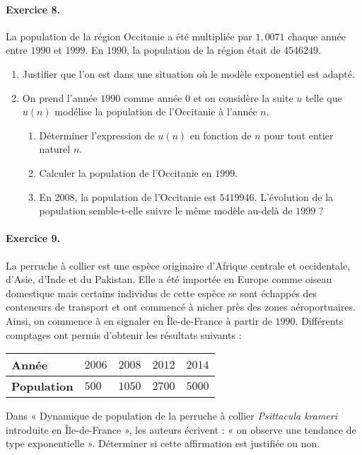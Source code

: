 \documentclass[11pt]{article}
\begin{document}
\paragraph{Exercice 8.}
La population de la région Occitanie a été multipliée par ${1,0071}$ chaque année
entre $1990$ et $1999$. En $1990$, la population de la région était de ${4 546 249}$.
\begin{enumerate}
	\item Justifier que l’on est dans une situation où le modèle exponentiel est adapté.
	\item On prend l’année $1990$ comme année $0$ et on considère la suite $u$ telle que $u(n)$ modélise la population de l’Occitanie à l’année $n$.
	\begin{enumerate}[leftmargin=*,label=\alph*)]
		\item Déterminer l’expression de $u(n)$ en fonction de $n$ pour tout entier naturel $n$.
		\item Calculer la population de l’Occitanie en $1999$.
		\item En 2008, la population de l’Occitanie est ${5 419 946}$.
		L’évolution de la population semble-t-elle suivre le même modèle au-delà
        de $1999$ ?
	\end{enumerate}
\end{enumerate}

\paragraph{Exercice 9.}
La perruche à collier est une espèce originaire d’Afrique centrale et
occidentale, d’Asie, d’Inde et du Pakistan. Elle a été importée en Europe comme
oiseau domestique mais certains individus de cette espèce se sont échappés des
conteneurs de transport et ont commencé à nicher près des zones aéroportuaires.
Ainsi, on commence à en signaler en Île-de-France à partir de $1990$. Différents
comptages ont permis d’obtenir les résultats suivants :
\begin{center}
	\begin{tabular}{|>{\centering\arraybackslash}m{2.5cm}|>{\centering\arraybackslash}m{1cm}|>{\centering\arraybackslash}m{1cm}|>{\centering\arraybackslash}m{1cm}|>{\centering\arraybackslash}m{1cm}|}
		\hline
		\rule[-1ex]{0pt}{2.5ex}  \textbf{Année} & $2006$ & $2008$ & $2012$ & $2014$  \\
		\hline
		\rule[-1ex]{0pt}{2.5ex}  \textbf{Population} & $500$ & ${1 050}$ & ${2 700}$ & ${5 000}$ \\
		\hline
	\end{tabular}
\end{center}
Dans « Dynamique de population de la perruche à collier \textit{Psittacula
krameri} introduite en Île-de-France », les auteurs écrivent : « on observe
une tendance de type exponentielle ».
Déterminer si cette affirmation est justifiée ou non.
\end{document}
